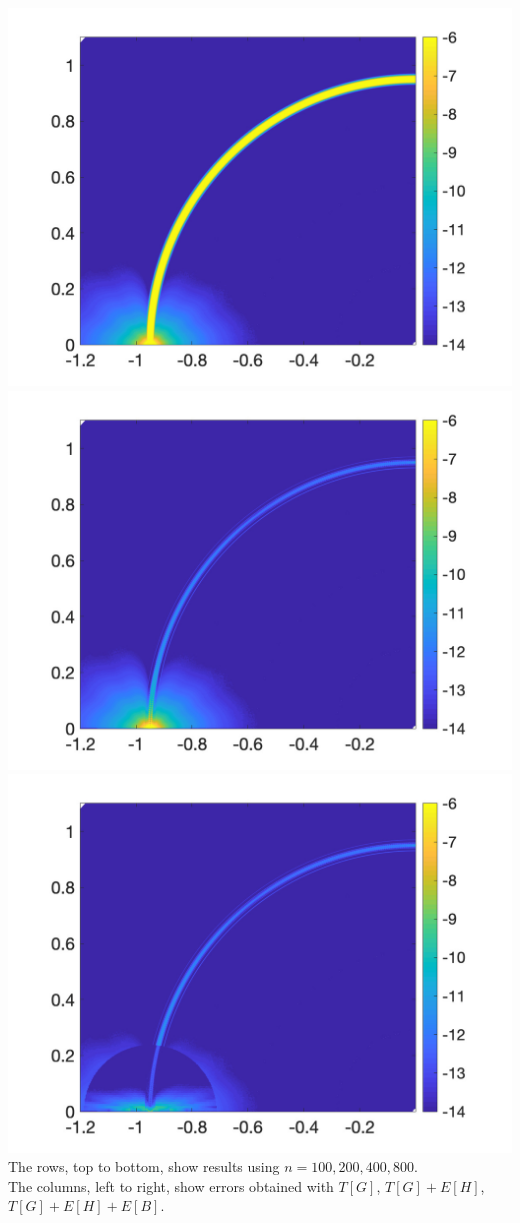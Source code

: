 \includegraphics[trim=40 20 40 10, clip, width=2.5truein]{figs/fig800a4} 
\includegraphics[trim=40 20 40 10, clip, width=2.5truein]{figs/fig800b4} 
\includegraphics[trim=40 20 40 10, clip, width=2.5truein]{figs/fig800c4} 
\vfill
\noindent
The rows, top to bottom, show results using $n=100,200,400,800$.\\
The columns, left to right, show errors obtained with $T[G]$, $T[G]+E[H]$, $T[G]+E[H]+E[B]$.



